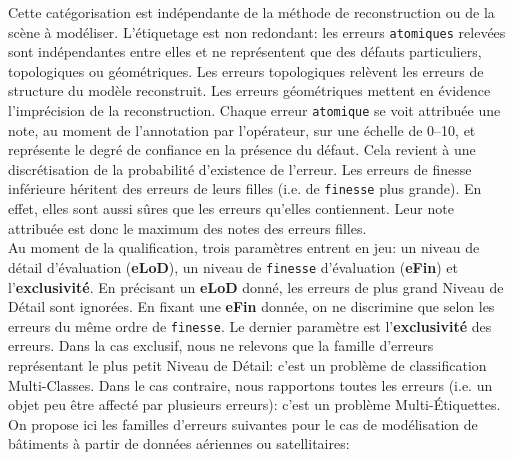         Cette catégorisation est indépendante de la méthode de reconstruction ou de la scène à modéliser.
        L'étiquetage est non redondant: les erreurs \texttt{atomiques} relevées sont indépendantes entre elles et ne représentent que des défauts particuliers, topologiques ou géométriques.
        Les erreurs topologiques relèvent les erreurs de structure du modèle reconstruit.
        Les erreurs géométriques mettent en évidence l'imprécision de la reconstruction.
        Chaque erreur \texttt{atomique} se voit attribuée une note, au moment de l'annotation par l'opérateur, sur une échelle de \numrange[locale=FR]{0}{10}, et représente le degré de confiance en la présence du défaut.
        Cela revient à une discrétisation de la probabilité d'existence de l'erreur.
        Les erreurs de finesse inférieure héritent des erreurs de leurs filles (i.e. de \texttt{finesse} plus grande).
        En effet, elles sont aussi sûres que les erreurs qu'elles contiennent.
        Leur note attribuée est donc le maximum des notes des erreurs filles.\\

        Au moment de la qualification, trois paramètres entrent en jeu: un niveau de détail d'évaluation (\textbf{eLoD}), un niveau de \texttt{finesse} d'évaluation (\textbf{eFin}) et l'\textbf{exclusivité}.
        En précisant un \textbf{eLoD} donné, les erreurs de plus grand Niveau de Détail sont ignorées.
        En fixant une \textbf{eFin} donnée, on ne discrimine que selon les erreurs du même ordre de \texttt{finesse}.
        Le dernier paramètre est l'\textbf{exclusivité} des erreurs.
        Dans la cas exclusif, nous ne relevons que la famille d'erreurs représentant le plus petit Niveau de Détail: c'est un problème de classification Multi-Classes.
        Dans le cas contraire, nous rapportons toutes les erreurs (i.e. un objet peu être affecté par plusieurs erreurs): c'est un problème Multi-\'Etiquettes.\\

        On propose ici les familles d'erreurs suivantes pour le cas de modélisation de bâtiments à partir de données aériennes ou satellitaires:


